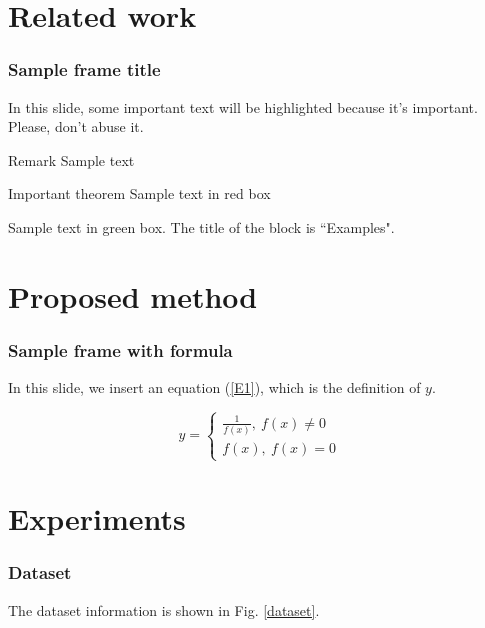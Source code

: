 \documentclass{beamer}
\begin{document}
\section{Related work}

\begin{frame}
\frametitle{Sample frame title}

In this slide, some important text will be
\alert{highlighted} because it's important.
Please, don't abuse it.

\begin{block}{Remark}
Sample text
\end{block}

\begin{alertblock}{Important theorem}
Sample text in red box
\end{alertblock}

\begin{examples}
Sample text in green box. The title of the block is ``Examples".
\end{examples}
\end{frame}

\section{Proposed method}

\begin{frame}
\frametitle{Sample frame with formula}

In this slide, we insert an equation (\ref{E1}), which is the definition of $y$.

\begin{equation}
\label{E1}
y=
\begin{cases}
\frac{1}{f(x)},\ f(x) \neq 0 \\
f(x), \ f(x)=0
\end{cases}
\end{equation}

\end{frame}


\section{Experiments}

\begin{frame}
\frametitle{Dataset}

The dataset information is shown in Fig. \ref{dataset}.
%

\end{frame}
\end{document}
